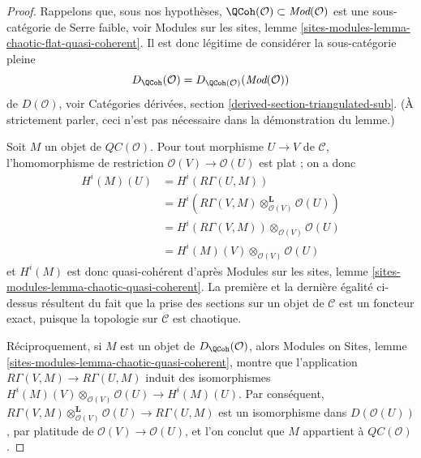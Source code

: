 \begin{proof}
Rappelons que, sous nos hypothèses,
$\QCoh(\mathcal{O}) \subset \textit{Mod}(\mathcal{O})$ est une sous-catégorie
de Serre faible, voir Modules sur les sites, lemme
\ref{sites-modules-lemma-chaotic-flat-quasi-coherent}. Il est donc légitime de
considérer la sous-catégorie pleine
$$
D_\QCoh(\mathcal{O}) = D_{\QCoh(\mathcal{O})}(\textit{Mod}(\mathcal{O}))
$$
de $D(\mathcal{O})$, voir Catégories dérivées, section
\ref{derived-section-triangulated-sub}. (À strictement parler, ceci n'est pas
nécessaire dans la démonstration du lemme.)

\medskip\noindent
Soit $M$ un objet de $\mathit{QC}(\mathcal{O})$. Pour tout morphisme
$U \to V$ de $\mathcal{C}$, l'homomorphisme de restriction
$\mathcal{O}(V) \to \mathcal{O}(U)$ est plat ; on a donc
\begin{align*}
H^i(M)(U)
& =
H^i(R\Gamma(U, M)) \\
& =
H^i(R\Gamma(V, M) \otimes_{\mathcal{O}(V)}^\mathbf{L} \mathcal{O}(U)) \\
& =
H^i(R\Gamma(V, M)) \otimes_{\mathcal{O}(V)} \mathcal{O}(U) \\
& =
H^i(M)(V) \otimes_{\mathcal{O}(V)} \mathcal{O}(U)
\end{align*}
et $H^i(M)$ est donc quasi-cohérent d'après Modules sur les sites, lemme
\ref{sites-modules-lemma-chaotic-quasi-coherent}. La première et la dernière
égalité ci-dessus résultent du fait que la prise des sections sur un objet de
$\mathcal{C}$ est un foncteur exact, puisque la topologie sur $\mathcal{C}$
est chaotique.

\medskip\noindent
Réciproquement, si $M$ est un objet de $D_\QCoh(\mathcal{O})$, alors Modules
on Sites, lemme \ref{sites-modules-lemma-chaotic-quasi-coherent}, montre que
l'application $R\Gamma(V, M) \to R\Gamma(U, M)$ induit des isomorphismes
$H^i(M)(V) \otimes_{\mathcal{O}(V)} \mathcal{O}(U) \to H^i(M)(U)$.
Par conséquent,
$R\Gamma(V, M) \otimes_{\mathcal{O}(V)}^\mathbf{L} \mathcal{O}(U)
\to R\Gamma(U, M)$ est un isomorphisme dans $D(\mathcal{O}(U))$, par platitude
de $\mathcal{O}(V) \to \mathcal{O}(U)$, et l'on conclut que $M$ appartient à
$\mathit{QC}(\mathcal{O})$.
\end{proof}

